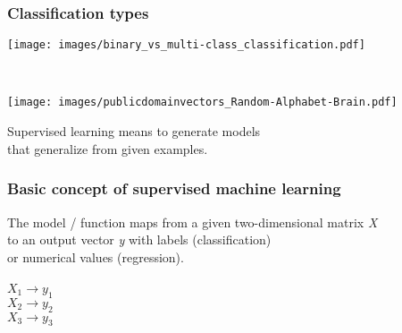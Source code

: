 \documentclass[aspectratio=169]{beamer}
\begin{document}
\begin{frame}
  \frametitle{Classification types}
  \begin{center}
    \texttt{[image: images/binary\_vs\_multi-class\_classification.pdf]}
  \end{center}  
\end{frame}


\begin{frame}
  \begin{block}{}
    \vspace{0.5cm}
    \ \ \ \
    \begin{minipage}{0.10\textwidth}
      \begin{center}
        \texttt{[image: images/publicdomainvectors\_Random-Alphabet-Brain.pdf]}
      \end{center}        
    \end{minipage}
    \hfill
    \begin{minipage}{0.80\textwidth}
      Supervised learning means to generate models \\
      that generalize from given examples.
    \end{minipage}
    \vspace{0.3cm}
  \end{block}
\end{frame}


\begin{frame}
  \frametitle{Basic concept of supervised machine learning}

  \begin{block}{}
      \begin{center}
        \vspace{0.5cm}
      The model / function maps from a given two-dimensional matrix \textit{X}\\
      to an output vector \textit{y} with labels (classification)\\ or numerical values (regression).\\
      \ \\
      
      $X_{1} \rightarrow y_{1}$\\
      $X_{2} \rightarrow y_{2}$\\
      $X_{3} \rightarrow y_{3}$\\

      \end{center}
    \end{block}
\end{frame}
\end{document}
